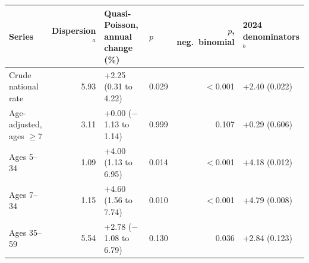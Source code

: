 \begin{tabular}{lrllrl}
\toprule
Series & Dispersion$^{a}$ & Quasi-Poisson, annual change (\%) & $p$ & $p$, neg.\ binomial & 2024 denominators$^{b}$ \\
\midrule
Crude national rate & 5.93 & +2.25 (0.31 to 4.22) & 0.029 & $<$0.001 & +2.40 (0.022) \\
Age-adjusted, ages $\geq$7 & 3.11 & +0.00 ($-$1.13 to 1.14) & 0.999 & 0.107 & +0.29 (0.606) \\
Ages 5--34 & 1.09 & +4.00 (1.13 to 6.95) & 0.014 & $<$0.001 & +4.18 (0.012) \\
Ages 7--34 & 1.15 & +4.60 (1.56 to 7.74) & 0.010 & $<$0.001 & +4.79 (0.008) \\
Ages 35--59 & 5.54 & +2.78 ($-$1.08 to 6.79) & 0.130 & 0.036 & +2.84 (0.123) \\
\bottomrule
\end{tabular}

